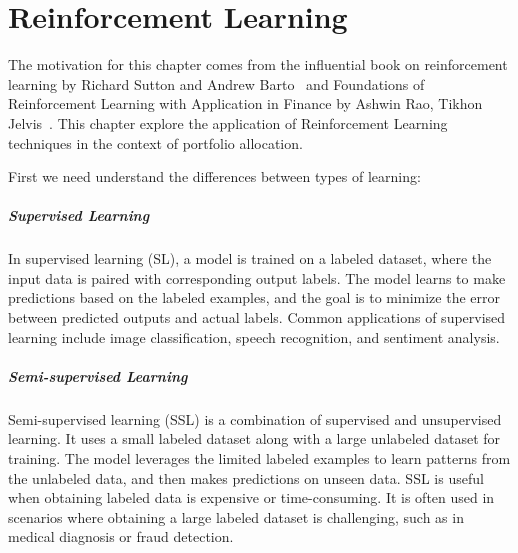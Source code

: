 \documentclass[../xlapes02]{subfiles}
\begin{document}
    \chapter{Reinforcement Learning}\label{ch:reinforcement-learning}

    The motivation for this chapter comes from the influential book on reinforcement learning by Richard Sutton and Andrew Barto~\cite{sutton2018reinforcement} and Foundations of Reinforcement Learning with Application in Finance by Ashwin Rao, Tikhon Jelvis~\cite{rao2022foundations}.
    This chapter explore the application of Reinforcement Learning techniques in the context of portfolio allocation.


    First we need understand the differences between types of learning:

    \paragraph{Supervised Learning}
    In supervised learning (SL), a model is trained on a labeled dataset, where the input data is paired with corresponding output labels. The model learns to make predictions based on the labeled examples, and the goal is to minimize the error between predicted outputs and actual labels. Common applications of supervised learning include image classification, speech recognition, and sentiment analysis.

    \paragraph{Semi-supervised Learning}
    Semi-supervised learning (SSL) is a combination of supervised and unsupervised learning. It uses a small labeled dataset along with a large unlabeled dataset for training. The model leverages the limited labeled examples to learn patterns from the unlabeled data, and then makes predictions on unseen data. SSL is useful when obtaining labeled data is expensive or time-consuming. It is often used in scenarios where obtaining a large labeled dataset is challenging, such as in medical diagnosis or fraud detection.
\end{document}

